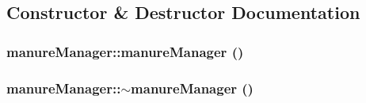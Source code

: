 \subsection{Constructor \& Destructor Documentation}
\hypertarget{classmanure_manager_a659b516b1113e1095ec540eb38382baf}{
\subsubsection[{manureManager}]{\setlength{\rightskip}{0pt plus 5cm}manureManager::manureManager ()}}
\label{classmanure_manager_a659b516b1113e1095ec540eb38382baf}
\hypertarget{classmanure_manager_ad4fe88aba295797780129c969f7629fc}{
\subsubsection[{$\sim$manureManager}]{\setlength{\rightskip}{0pt plus 5cm}manureManager::$\sim$manureManager ()}}
\label{classmanure_manager_ad4fe88aba295797780129c969f7629fc}


